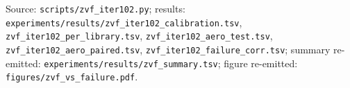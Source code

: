 Source: \texttt{scripts/zvf\_iter102.py};
results: \texttt{experiments/results/zvf\_iter102\_calibration.tsv},
\texttt{zvf\_iter102\_per\_library.tsv},
\texttt{zvf\_iter102\_aero\_test.tsv},
\texttt{zvf\_iter102\_aero\_paired.tsv},
\texttt{zvf\_iter102\_failure\_corr.tsv};
summary re-emitted: \texttt{experiments/results/zvf\_summary.tsv};
figure re-emitted: \texttt{figures/zvf\_vs\_failure.pdf}.